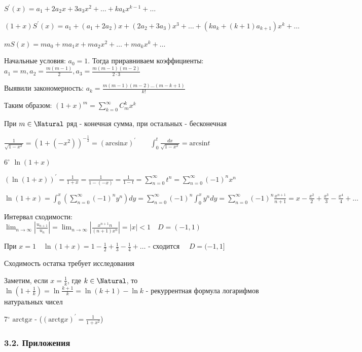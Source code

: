 \documentclass[12pt]{article}
\begin{document}
    $S^\prime(x) = a_1 + 2a_2 x + 3a_3 x^2 + \dots + k a_k x^{k - 1} + \dots$

    $(1 + x) S^\prime(x) = a_1 + (a_1 + 2a_2)x + (2a_2 + 3a_3) x^3 + \dots + (k a_k + (k + 1) a_{k + 1})x^k + \dots$

    $mS(x) = ma_0 + ma_1 x + ma_2 x^2 + \dots + m a_k x^k + \dots$

    Начальные условия: $a_0 = 1$. Тогда приравниваем коэффициенты: $a_1 = m, a_2 = \frac{m(m - 1)}{2}, a_3 = \frac{m(m - 1)(m - 2)}{2 \cdot 3}$

    Выявили закономерность: $a_k = \frac{m(m - 1)(m - 2)\dots(m - k + 1)}{k!}$

    Таким образом: $(1 + x)^m = \sum_{k = 0}^\infty C_m^k x^k$

    При $m \in \Natural$ ряд - конечная сумма, при остальных - бесконечная

    \Lab $\frac{1}{\sqrt{1 - x^2}} = (1 + (-x^2))^{-\frac{1}{2}} = (\mathrm{arcsin} x)^\prime \qquad \int_0^t \frac{dx}{\sqrt{1 - x^2}} = \mathrm{arcsin} t$

    \mediumvspace

    6$^\circ$ $\ln(1 + x)$

    $(\ln(1 + x))^\prime = \frac{1}{1 + x} = \frac{1}{1 - (-x)} = \frac{1}{1 - t} = \sum_{n = 0}^\infty t^n = 
    \sum_{n = 0}^\infty (-1)^n x^n$

    $\ln(1 + x) = \int_0^x (\sum_{n = 0}^\infty (-1)^n y^n) dy = \sum_{n = 0}^\infty (-1)^n \int_0^x y^n dy = 
    \sum_{n = 0}^\infty (-1)^n \frac{x^{n + 1}}{n + 1} = x - \frac{x^2}{2} + \frac{x^3}{3} - \frac{x^4}{4} + \dots$
    
    Интервал сходимости: $\lim_{n \to \infty} \left|\frac{u_{n + 1}}{u_n}\right| = 
    \lim_{n \to \infty} \left|\frac{x^{n + 1} n}{(n + 1) x^n}\right| = |x| < 1 \quad D = (-1, 1)$

    При $x = 1 \quad \ln(1 + x) = 1 - \frac{1}{2} + \frac{1}{3} - \frac{1}{4} + \dots$ - сходится $\quad D = (-1, 1]$

    \Notas Сходимость остатка требует исследования

    \Nota Заметим, если $x = \frac{1}{k}$, где $k \in \Natural$, то $\ln(1 + \frac{1}{k}) = \ln\frac{k + 1}{k} = \ln (k + 1) - \ln k$ - рекуррентная формула
    логарифмов натуральных чисел

    \mediumvspace

    7$^\circ$ $\mathrm{arctg} x$ - \Lab ($(\mathrm{arctg} x)^\prime = \frac{1}{1 + x^2}$)

    \subsubsection{3.2. Приложения}
\end{document}

